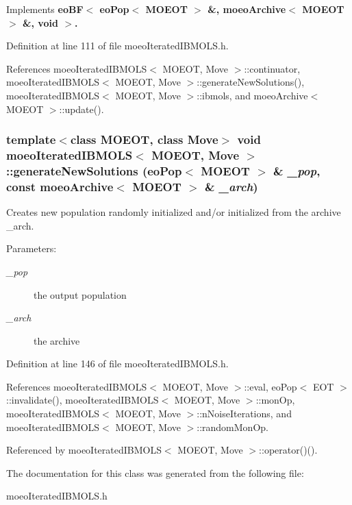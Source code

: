 Implements \bf{eo\-BF$<$ eo\-Pop$<$ MOEOT $>$ \&, moeo\-Archive$<$ MOEOT $>$ \&, void $>$}.

Definition at line 111 of file moeo\-Iterated\-IBMOLS.h.

References moeo\-Iterated\-IBMOLS$<$ MOEOT, Move $>$::continuator, moeo\-Iterated\-IBMOLS$<$ MOEOT, Move $>$::generate\-New\-Solutions(), moeo\-Iterated\-IBMOLS$<$ MOEOT, Move $>$::ibmols, and moeo\-Archive$<$ MOEOT $>$::update().
\subsubsection{\setlength{\rightskip}{0pt plus 5cm}template$<$class MOEOT, class Move$>$ void \bf{moeo\-Iterated\-IBMOLS}$<$ MOEOT, Move $>$::generate\-New\-Solutions (\bf{eo\-Pop}$<$ MOEOT $>$ \& {\em \_\-pop}, const \bf{moeo\-Archive}$<$ MOEOT $>$ \& {\em \_\-arch})\hspace{0.3cm}{\tt  [inline, private]}}\label{classmoeoIteratedIBMOLS_2826cf283f6670b3c46da5ac6b6def18}


Creates new population randomly initialized and/or initialized from the archive \_\-arch. 

\begin{Desc}
\item[Parameters:]
\begin{description}
\item[{\em \_\-pop}]the output population \item[{\em \_\-arch}]the archive \end{description}
\end{Desc}


Definition at line 146 of file moeo\-Iterated\-IBMOLS.h.

References moeo\-Iterated\-IBMOLS$<$ MOEOT, Move $>$::eval, eo\-Pop$<$ EOT $>$::invalidate(), moeo\-Iterated\-IBMOLS$<$ MOEOT, Move $>$::mon\-Op, moeo\-Iterated\-IBMOLS$<$ MOEOT, Move $>$::n\-Noise\-Iterations, and moeo\-Iterated\-IBMOLS$<$ MOEOT, Move $>$::random\-Mon\-Op.

Referenced by moeo\-Iterated\-IBMOLS$<$ MOEOT, Move $>$::operator()().

The documentation for this class was generated from the following file:\begin{CompactItemize}
\item 
moeo\-Iterated\-IBMOLS.h\end{CompactItemize}
